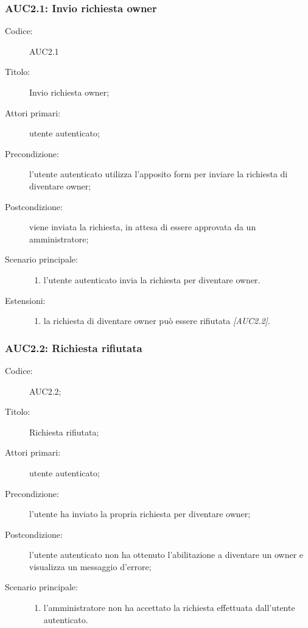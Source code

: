 \documentclass[../../../analisi-dei-requisiti.tex]{subfiles}
\begin{document}
\subsubsection{AUC2.1: Invio richiesta owner}%
\label{subs:AUC2.1}
\begin{description}
  \item[Codice:] AUC2.1
  \item[Titolo:] Invio richiesta owner;
  \item[Attori primari:] utente autenticato;
  \item[Precondizione:] l'utente autenticato utilizza l'apposito form per inviare la richiesta di diventare owner;
  \item[Postcondizione:] viene inviata la richiesta, in attesa di essere approvata da un amministratore;
  \item[Scenario principale:]
  \begin{enumerate}
    \item l'utente autenticato invia la richiesta per diventare owner.
  \end{enumerate}
  \item[Estensioni:]
  \begin{enumerate}
    \item la richiesta di diventare owner può essere rifiutata \emph{[AUC2.2]}.
  \end{enumerate}
\end{description}

\subsubsection{AUC2.2: Richiesta rifiutata}%
\label{subs:AUC2.2}
\begin{description}
  \item[Codice:] AUC2.2;
  \item[Titolo:] Richiesta rifiutata;
  \item[Attori primari:] utente autenticato;
  \item[Precondizione:] l'utente ha inviato la propria richiesta per diventare owner;
  \item[Postcondizione:] l'utente autenticato non ha ottenuto l'abilitazione a diventare un owner e visualizza un messaggio d'errore;
  \item[Scenario principale:]
  \begin{enumerate}
    \item l'amministratore non ha accettato la richiesta effettuata dall'utente autenticato.
  \end{enumerate}
\end{description}
\end{document}
